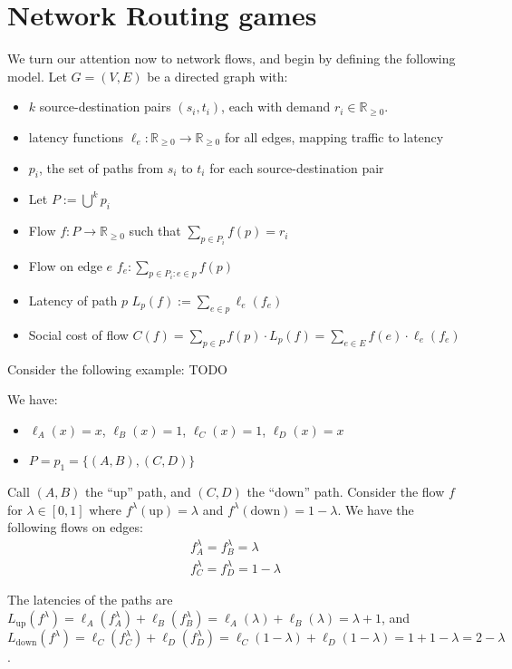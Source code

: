 \section{Network Routing games}
We turn our attention now to network flows, and begin by defining the following
model. Let $G=(V,E)$ be a directed graph with:
\begin{itemize}
	\item $k$ source-destination pairs $(s_i, t_i)$, each with demand $r_i \in \mathbb{R}_{\ge 0}$.
	\item latency functions $\ell_e : \mathbb{R}_{\ge 0} \rightarrow
		\mathbb{R}_{\ge 0}$ for all edges, mapping traffic to latency
	\item $p_i$, the set of paths from $s_i$ to $t_i$ for each
		source-destination pair
	\item Let $P := \bigcup^k p_i$
	\item Flow $f : P \rightarrow \mathbb{R}_{\ge 0}$ such that $\sum_{p \in
		P_i} f(p) = r_i$
	\item Flow on edge $e$ $f_e : \sum_{p \in P_i : e \in p} f(p)$
	\item Latency of path $p$ $L_p (f) := \sum_{e \in p} \ell_e (f_e)$
	\item Social cost of flow $C(f) = \sum_{p \in P} f(p) \cdot L_p(f) =
		\sum_{e \in E} f(e) \cdot \ell_e (f_e)$
\end{itemize}

Consider the following example:
TODO

We have:
\begin{itemize}
	\item $\ell_A(x) = x$, $\ell_B(x) = 1$, $\ell_C(x) = 1$, $\ell_D(x) = x$
	\item $P = p_1 = \{ (A,B), (C,D) \}$
\end{itemize}

Call $(A,B)$ the ``up'' path, and $(C,D)$ the ``down'' path. Consider the flow
$f$ for $\lambda \in [0,1]$ where $f^\lambda(\text{up}) = \lambda$ and
$f^\lambda(\text{down}) = 1 - \lambda$. We have the following flows on edges:
\begin{equation*}
	\begin{split}
		f_A^\lambda = f_B^\lambda = \lambda \\
		f_C^\lambda = f_D^\lambda = 1 - \lambda
	\end{split}
\end{equation*}

The latencies of the paths are $L_\text{up}(f^\lambda) =
\ell_A(f_A^\lambda) + \ell_B(f_B^\lambda) = \ell_A(\lambda) + \ell_B(\lambda) =
\lambda + 1$, and $L_\text{down}(f^\lambda) = \ell_C(f_C^\lambda) +
\ell_D(f_D^\lambda) = \ell_C(1 - \lambda) + \ell_D(1 - \lambda) = 1 + 1 -
\lambda = 2 - \lambda$.
